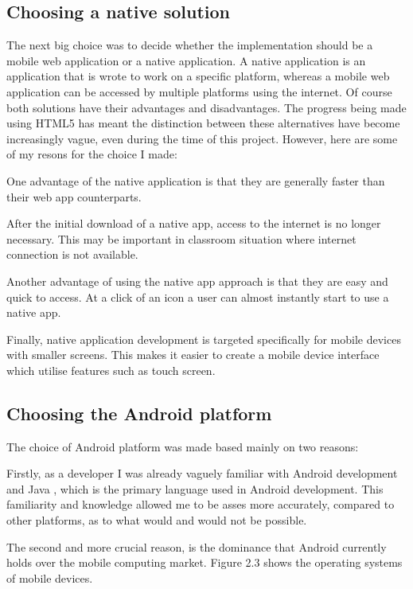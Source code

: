 \subsection{Choosing a native solution}

The next big choice was to decide whether the implementation should be a mobile web application or a native application. A native application is an application that is wrote to work on a specific platform, whereas a mobile web application can be accessed by multiple platforms using the internet. Of course both solutions have their advantages and disadvantages. The progress being made using HTML5 has meant the distinction between these alternatives have become increasingly vague, even during the time of this project. However, here are some of my resons for the choice I made: 
	
One advantage of the native application is that they are generally faster than their web app counterparts. 

After the initial download of a native app, access to the internet is no longer necessary. This may be important in classroom situation where internet connection is not available.

Another advantage of using the native app approach is that they are easy and quick to access. At a click of an icon a user can almost instantly start to use a native app.

Finally, native application development is targeted specifically for mobile devices with smaller screens. This makes it easier to create a mobile device interface which utilise features such as touch screen.








\subsection{Choosing the Android platform}

The choice of Android platform was made based mainly on two reasons:

Firstly, as a developer I was already vaguely familiar with Android development and  Java , which is the primary language used in Android development. This familiarity and knowledge allowed me to be asses more accurately, compared to other platforms,  as to what would and would not be possible.

The second and more crucial reason, is the dominance that Android currently holds over the mobile computing market. Figure 2.3 shows the operating systems of mobile devices. 


